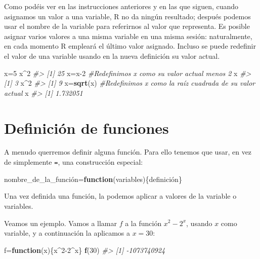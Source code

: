 \documentclass[
]{book}
\newenvironment{Shaded}{\begin{snugshade}}{\end{snugshade}}
\newcommand{\CommentTok}[1]{\textcolor[rgb]{0.56,0.35,0.01}{\textit{#1}}}
\newcommand{\ControlFlowTok}[1]{\textcolor[rgb]{0.13,0.29,0.53}{\textbf{#1}}}
\newcommand{\DecValTok}[1]{\textcolor[rgb]{0.00,0.00,0.81}{#1}}
\newcommand{\KeywordTok}[1]{\textcolor[rgb]{0.13,0.29,0.53}{\textbf{#1}}}
\newcommand{\NormalTok}[1]{#1}
\newcommand{\OperatorTok}[1]{\textcolor[rgb]{0.81,0.36,0.00}{\textbf{#1}}}
\theoremstyle{definition}
\theoremstyle{definition}
\theoremstyle{definition}
\theoremstyle{remark}
\begin{document}
Como podéis ver en las instrucciones anteriores y en las que siguen, cuando asignamos un valor a una variable, R no da ningún resultado; después podemos usar el nombre de la variable para referirnos al valor que representa.
Es posible asignar varios valores a una misma variable en una misma sesión: naturalmente, en cada momento R empleará el último valor asignado. Incluso se puede redefinir el valor de una variable usando en la nueva definición su valor actual.

\begin{Shaded}
\begin{Highlighting}[]
\NormalTok{x=}\DecValTok{5}
\NormalTok{x}\OperatorTok{\^{}}\DecValTok{2}
\CommentTok{\#\textgreater{} [1] 25}
\NormalTok{x=x}\DecValTok{{-}2} \CommentTok{\#Redefinimos x como su valor actual menos 2}
\NormalTok{x}
\CommentTok{\#\textgreater{} [1] 3}
\NormalTok{x}\OperatorTok{\^{}}\DecValTok{2}
\CommentTok{\#\textgreater{} [1] 9}
\NormalTok{x=}\KeywordTok{sqrt}\NormalTok{(x) }\CommentTok{\#Redefinimos x como la raíz cuadrada de su valor actual}
\NormalTok{x}
\CommentTok{\#\textgreater{} [1] 1.732051}
\end{Highlighting}
\end{Shaded}

\hypertarget{definiciuxf3n-de-funciones}{%
\section{Definición de funciones}\label{definiciuxf3n-de-funciones}}

A menudo querremos definir alguna función. Para ello tenemos que usar, en vez de simplemente \texttt{=}, una construcción especial:

\begin{Shaded}
\begin{Highlighting}[]
\NormalTok{nombre\_de\_la\_función=}\ControlFlowTok{function}\NormalTok{(variables)\{definición\}}
\end{Highlighting}
\end{Shaded}

Una vez definida una función, la podemos aplicar a valores de la variable o variables.

Veamos un ejemplo. Vamos a llamar \(f\) a la función \(x^2-2^x\), usando \(x\) como variable, y a continuación la aplicamos a \(x=30\):

\begin{Shaded}
\begin{Highlighting}[]
\NormalTok{f=}\ControlFlowTok{function}\NormalTok{(x)\{x}\OperatorTok{\^{}}\DecValTok{2{-}2}\OperatorTok{\^{}}\NormalTok{x\}}
\KeywordTok{f}\NormalTok{(}\DecValTok{30}\NormalTok{)}
\CommentTok{\#\textgreater{} [1] {-}1073740924}
\end{Highlighting}
\end{Shaded}
\end{document}
